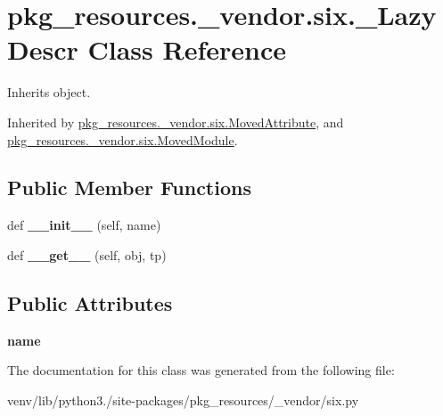 \hypertarget{classpkg__resources_1_1__vendor_1_1six_1_1___lazy_descr}{}\section{pkg\+\_\+resources.\+\_\+vendor.\+six.\+\_\+\+Lazy\+Descr Class Reference}
\label{classpkg__resources_1_1__vendor_1_1six_1_1___lazy_descr}


Inherits object.



Inherited by \hyperlink{classpkg__resources_1_1__vendor_1_1six_1_1_moved_attribute}{pkg\+\_\+resources.\+\_\+vendor.\+six.\+Moved\+Attribute}, and \hyperlink{classpkg__resources_1_1__vendor_1_1six_1_1_moved_module}{pkg\+\_\+resources.\+\_\+vendor.\+six.\+Moved\+Module}.

\subsection*{Public Member Functions}
\begin{DoxyCompactItemize}
\item 
\mbox{\label{classpkg__resources_1_1__vendor_1_1six_1_1___lazy_descr_ab2a6a6b0d97cdc6764782bbe82c76719}} 
def {\bfseries \+\_\+\+\_\+init\+\_\+\+\_\+} (self, name)
\item 
\mbox{\label{classpkg__resources_1_1__vendor_1_1six_1_1___lazy_descr_afd74cf7554916f48b628bd87c3eb6893}} 
def {\bfseries \+\_\+\+\_\+get\+\_\+\+\_\+} (self, obj, tp)
\end{DoxyCompactItemize}
\subsection*{Public Attributes}
\begin{DoxyCompactItemize}
\item 
\mbox{\label{classpkg__resources_1_1__vendor_1_1six_1_1___lazy_descr_a0f4c26a527ada80f9d23fdcbbfa4ea9d}} 
{\bfseries name}
\end{DoxyCompactItemize}


The documentation for this class was generated from the following file\+:\begin{DoxyCompactItemize}
\item 
venv/lib/python3./site-\/packages/pkg\+\_\+resources/\+\_\+vendor/six.\+py\end{DoxyCompactItemize}
